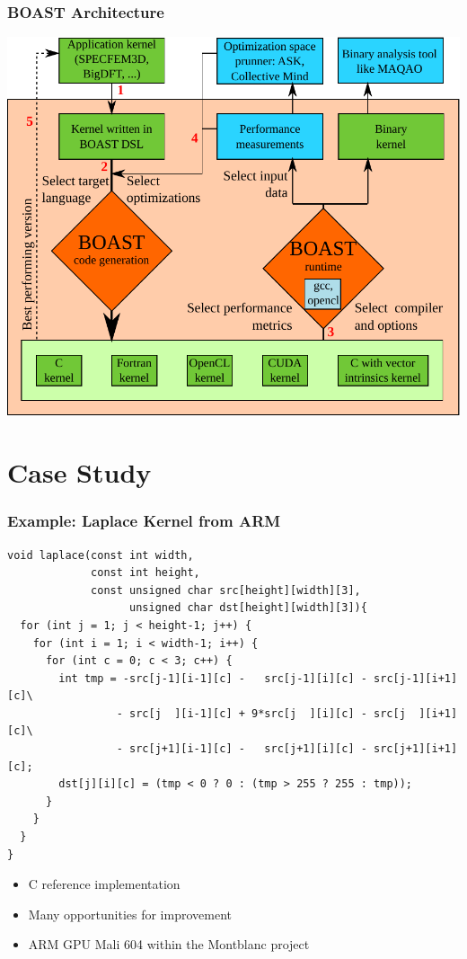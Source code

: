\documentclass{beamer}
\begin{document}
\begin{frame}
\frametitle{BOAST Architecture}
 \begin{center}
   \includegraphics[scale=0.5]{BOAST_Workflow}
 \end{center}
\end{frame}

\section{Case Study}

\begin{frame}[fragile]
  \frametitle{Example: Laplace Kernel from ARM}
\tiny
{}
\begin{lstlisting}
void laplace(const int width,
             const int height,
             const unsigned char src[height][width][3],
                   unsigned char dst[height][width][3]){
  for (int j = 1; j < height-1; j++) {
    for (int i = 1; i < width-1; i++) {
      for (int c = 0; c < 3; c++) {
        int tmp = -src[j-1][i-1][c] -   src[j-1][i][c] - src[j-1][i+1][c]\
                 - src[j  ][i-1][c] + 9*src[j  ][i][c] - src[j  ][i+1][c]\
                 - src[j+1][i-1][c] -   src[j+1][i][c] - src[j+1][i+1][c];
        dst[j][i][c] = (tmp < 0 ? 0 : (tmp > 255 ? 255 : tmp));
      }
    }
  }
}
\end{lstlisting}
\begin{itemize}
\item C reference implementation
\item Many opportunities for improvement
\item ARM GPU Mali 604 within the Montblanc project
\end{itemize}
\end{frame}
\end{document}
